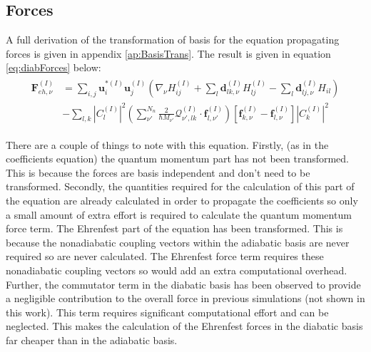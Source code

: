 \subsection{Forces}
A full derivation of the transformation of basis for the equation propagating forces is given in appendix \ref{ap:BasisTrans}. The result is given in equation \eqref{eq:diabForces} below:
\begin{align}
  \begin{split}
	  \mathbf{F}_{eh, \nu}^{(I)} &= \sum_{i,j} \mathbf{u}_{i}^{*(I)} \mathbf{u}_{j}^{(I)} \left( \nabla_{\nu} H_{ij}^{(I)} + \sum_{l} \mathbf{d}_{lk, \nu}^{(I)} H_{lj}^{(I)} - \sum_{l} \mathbf{d}_{lj, \nu}^{(I)} H_{il} \right) \\
	  &- \sum_{l,k} |C_{l}^{(I)}|^2 \left( \sum_{\nu'}^{N_{n}} \frac{2}{\hbar M_{\nu'}} \mathcal{Q}_{\nu', lk}^{(I)} \cdot                   \mathbf{f}_{l, \nu'}^{(I)} \right)\left[ \mathbf{f}_{k, \nu}^{(I)} -          \mathbf{f}_{l, \nu}^{(I)} \right] |C_{k}^{(I)}|^2
	\end{split}
  \label{eq:diabForces}
\end{align}

\noindent There are a couple of things to note with this equation. Firstly, (as in the coefficients equation) the quantum momentum part has not been transformed. This is because the forces are basis independent and don't need to be transformed. Secondly, the quantities required for the calculation of this part of the equation are already calculated in order to propagate the coefficients so only a small amount of extra effort is required to calculate the quantum momentum force term. The Ehrenfest part of the equation has been transformed. This is because the nonadiabatic coupling vectors within the adiabatic basis are never required so are never calculated. The Ehrenfest force term requires these nonadiabatic coupling vectors so would add an extra computational overhead. Further, the commutator term in the diabatic basis has been observed to provide a negligible contribution to the overall force in previous simulations (not shown in this work). This term requires significant computational effort and can be neglected. This makes the calculation of the Ehrenfest forces in the diabatic basis far cheaper than in the adiabatic basis.

